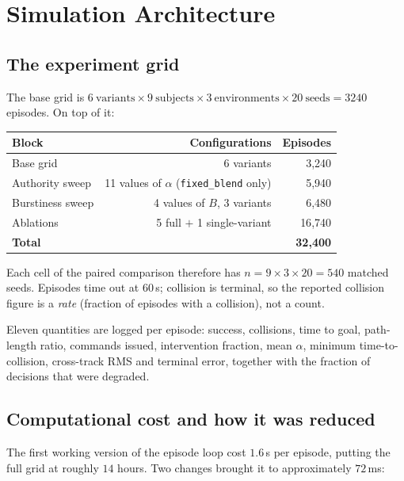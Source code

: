\documentclass[11pt,a4paper]{article}
\newcommand{\vfixed}{\texttt{fixed\_blend}}
\theoremstyle{plain}
\theoremstyle{definition}
\begin{document}
\section{Simulation Architecture}
\label{sec:sim}

\subsection{The experiment grid}

The base grid is
$6\ \text{variants} \times 9\ \text{subjects} \times
3\ \text{environments} \times 20\ \text{seeds} = 3240$ episodes. On top
of it:

\begin{center}
\small
\begin{tabular}{@{}lrr@{}}
\toprule
Block & Configurations & Episodes \\
\midrule
Base grid & 6 variants & 3{,}240 \\
Authority sweep & 11 values of $\alpha$ (\vfixed{} only) & 5{,}940 \\
Burstiness sweep & 4 values of $B$, 3 variants & 6{,}480 \\
Ablations & 5 full $+$ 1 single-variant & 16{,}740 \\
\midrule
\textbf{Total} & & \textbf{32{,}400} \\
\bottomrule
\end{tabular}
\end{center}

Each cell of the paired comparison therefore has
$n = 9 \times 3 \times 20 = 540$ matched seeds. Episodes time out at
$60$\,s; collision is terminal, so the reported collision figure is a
\emph{rate} (fraction of episodes with a collision), not a count.

Eleven quantities are logged per episode: success, collisions, time to goal,
path-length ratio, commands issued, intervention fraction, mean
$\alpha$, minimum time-to-collision, cross-track RMS and terminal error,
together with the fraction of decisions that were degraded.

\subsection{Computational cost and how it was reduced}

The first working version of the episode loop cost $1.6$\,s per episode,
putting the full grid at roughly $14$ hours. Two changes brought it to
approximately $72$\,ms:
\end{document}
